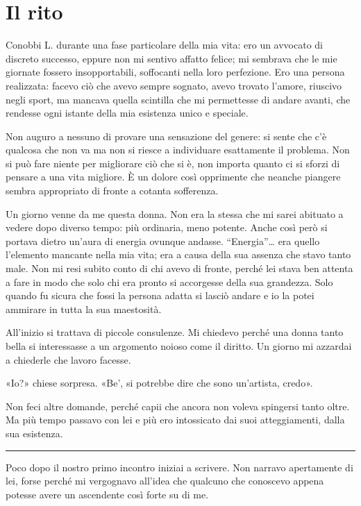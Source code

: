 \documentclass[a4paper,10pt]{memoir}
\begin{document}
\chapter{Il rito}

Conobbi L. durante una fase particolare della mia vita: ero un avvocato di discreto successo, eppure non mi sentivo
affatto felice; mi sembrava che le mie giornate fossero insopportabili, soffocanti nella loro perfezione. Ero una
persona realizzata: facevo ciò che avevo sempre sognato, avevo trovato l'amore, riuscivo negli sport, ma mancava quella
scintilla che mi permettesse di andare avanti, che rendesse ogni istante della mia esistenza unico e speciale.

Non auguro a nessuno di provare una sensazione del genere: si sente che c'è qualcosa che non va ma non si riesce a
individuare esattamente il problema. Non si può fare niente per migliorare ciò che si è, non importa quanto ci si sforzi
di pensare a una vita migliore. È un dolore così opprimente che neanche piangere sembra appropriato di fronte a cotanta
sofferenza.

Un giorno venne da me questa donna. Non era la stessa che mi sarei abituato a vedere dopo diverso tempo: più ordinaria,
meno potente. Anche così però si portava dietro un'aura di energia ovunque andasse. ``Energia''\dots{} era quello
l'elemento mancante nella mia vita; era a causa della sua assenza che stavo tanto male. Non mi resi subito conto di chi
avevo di fronte, perché lei stava ben attenta a fare in modo che solo chi era pronto si accorgesse della sua grandezza.
Solo quando fu sicura che fossi la persona adatta si lasciò andare e io la potei ammirare in tutta la sua maestosità.

All'inizio si trattava di piccole consulenze. Mi chiedevo perché una donna tanto bella si interessasse a un argomento
noioso come il diritto. Un giorno mi azzardai a chiederle che lavoro facesse.

«Io?» chiese sorpresa. «Be', si potrebbe dire che sono un'artista, credo».

Non feci altre domande, perché capii che ancora non voleva spingersi tanto oltre. Ma più tempo passavo con lei e più ero
intossicato dai suoi atteggiamenti, dalla sua esistenza.

\plainbreak{1}

Poco dopo il nostro primo incontro iniziai a scrivere. Non narravo apertamente di lei, forse perché mi vergognavo
all'idea che qualcuno che conoscevo appena potesse avere un ascendente così forte su di me.
\end{document}
